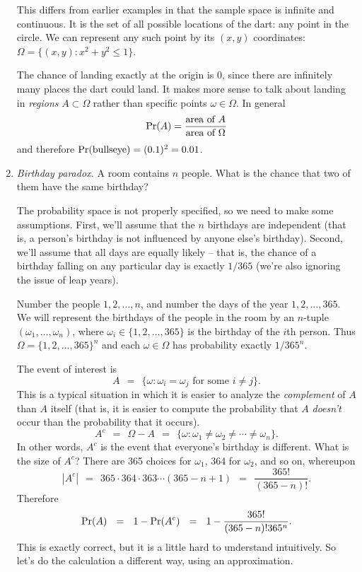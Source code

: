 \begin{enumerate}
This differs from earlier examples in that the sample space is infinite and continuous. It is the set of all possible locations of the dart: any point in the circle. We can represent any such point by its $(x,y)$ coordinates: $\Omega = \{(x,y): x^2 + y^2 \leq 1\}$.

The chance of landing exactly at the origin is 0, since there are infinitely many places the dart could land. It makes more sense to talk about landing in {\it regions} $A \subset \Omega$ rather than specific points $\omega \in \Omega$. In general
$$ \mbox{\rm Pr}(A) = \frac{\mbox{area of $A$}}{\mbox{area of $\Omega$}} $$
and therefore $\mbox{\rm Pr}(\mbox{bullseye}) = (0.1)^2 = 0.01$.

\item {\it Birthday paradox.} A room contains $n$ people. What is the chance that two of them have the same birthday?

The probability space is not properly specified, so we need to make some assumptions. First, we'll assume that the $n$ birthdays are independent (that is, a person's birthday is not influenced by anyone else's birthday). Second, we'll assume that all days are equally likely -- that is, the chance of a birthday falling on any particular day is exactly $1/365$ (we're also ignoring the issue of leap years).

Number the people $1,2,\ldots, n$, and number the days of the year $1,2,\ldots, 365$. We will represent the birthdays of the people in the room by an $n$-tuple $(\omega_1, \ldots, \omega_n)$, where $\omega_i \in \{1,2,\ldots,365\}$ is the birthday of the $i$th person. Thus $\Omega = \{1,2,\ldots, 365\}^n$ and each $\omega \in \Omega$ has probability exactly $1/365^n$.

The event of interest is
$$ A  \ \ = \ \ \{\omega: \mbox{$\omega_i = \omega_j$ for some $i \neq j$} \}.$$
This is a typical situation in which it is easier to analyze the {\it complement} of $A$ than $A$ itself (that is, it is easier to compute the probability that $A$ {\it doesn't} occur than the probability that it occurs).
$$ A^c \ \ = \ \ \Omega - A \ \ = \ \ \{\omega: \omega_1 \neq \omega_2 \neq \cdots \neq \omega_n\}.$$
In other words, $A^c$ is the event that everyone's birthday is different. What is the size of $A^c$? There are 365 choices for $\omega_1$, 364 for $\omega_2$, and so on, whereupon
$$ |A^c| \ \ = \ \ 365 \cdot 364 \cdot 363 \cdots (365-n+1) \ \ = \ \ \frac{365!}{(365-n)!}.$$Therefore
$$ \mbox{\rm Pr}(A) \ \ = \ \ 1 - \mbox{\rm Pr}(A^c) \ \ = \ \ 1 - \frac{365!}{(365-n)!365^n} .$$
This is exactly correct, but it is a little hard to understand intuitively. So let's do the calculation a different way, using an approximation.


\end{enumerate}
